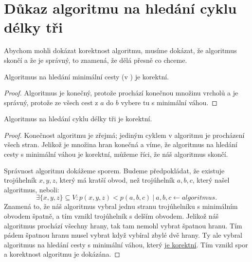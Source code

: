 \section{Důkaz algoritmu na hledání cyklu délky tři}
\label{dukaz_algoritmu}

Abychom mohli dokázat korektnost algoritmu, musíme dokázat, že algoritmus skončí a že je správný, to znamená, že dělá přesně co chceme.

\begin{tvrzeni}
    \label{tvrzeni:adaptace}
    Algoritmus na hledání minimální cesty (v ) je korektní.
\end{tvrzeni}
\begin{proof}
    \label{dukaz:adaptace}
    Algoritmus je konečný, protože prochází konečnou množinu vrcholů a je správ\-ný, protože ze všech cest z $a$ do $b$ vybere tu s minimální váhou. 
\end{proof}
\begin{tvrzeni}
    \label{tvrzeni:algoritmus}
    Algoritmus na hledání cyklu délky tři je korektní.
\end{tvrzeni}
\begin{proof}
    \label{dukaz:algoritmus}
Konečnost algoritmu je zřejmá; jediným cyklem v algoritmu je procházení všech stran. Jelikož je množina hran konečná a víme, že algoritmus na hledání cesty s minimální váhou je korektní, můžeme říci, že náš algoritmus skončí.

Správnost algoritmu dokážeme sporem. Budeme předpokládat, že existuje trojúhelník $x, y, z$, který má kratší obvod, než trojúhelník $a, b, c$, který našel algoritmus, neboli:
\begin{equation*}
    \exists \{x, y, z\}\subseteq V: p(x, y, z) < p(a, b, c)~|~a, b, c \leftarrow algoritmus.
\end{equation*}
Znamená to, že náš algoritmus vybral jednu stranu trojúhelníku s minimálním obvodem špatně, a tím vznikl trojúhelník s delším obvodem. Jelikož náš algoritmus prochází všechny hrany, tak tam nemohl vybrat špatnou hranu. Tím pádem špatnou hranu musel vybrat když vybíral zbylé dvě hrany. Ty ale vybral algoritmus na hledání cesty s minimální váhou, který \hyperref[dukaz:adaptace]{je korektní}. Tím vznikl spor a korektnost algoritmu je dokázána. 
\end{proof}